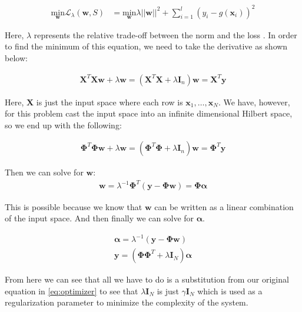 \documentclass[11pt, twoside]{article}   	%
\begin{document}
\begin{align*}
\underset{\mathbf{w}}{\text{min}} \mathbf{\mathcal{L}}_\lambda (\mathbf{w}, S) &= 
\underset{\mathbf{w}}{\text{min}} \lambda ||\mathbf{w}||^2 + \sum_{i=1}^{l}(y_i - g(\mathbf{x}_i))^2
\end{align*}

Here, $\lambda$ represents the relative trade-off between the norm and the loss \cite{kernelmethods}. In order to find the minimum of this equation, 
we need to take the derivative as shown below: 

\begin{align*}
\mathbf{X}^T\mathbf{X}\mathbf{w} + \lambda\mathbf{w} = (\mathbf{X}^T\mathbf{X} + \lambda \mathbf{I}_n)\mathbf{w} = \mathbf{X}^T\mathbf{y}
\end{align*}

Here, $\mathbf{X}$ is just the input space where each row is $\mathbf{x}_1, \ldots, \mathbf{x}_N$. We have, however, for this problem
cast the input space into an infinite dimensional Hilbert space, so we end up with the following: 

\begin{align*}
\mathbf{\Phi}^T\mathbf{\Phi}\mathbf{w} + \lambda\mathbf{w} = (\mathbf{\Phi}^T\mathbf{\Phi} + \lambda \mathbf{I}_n)\mathbf{w} = \mathbf{\Phi}^T\mathbf{y}
\end{align*}

Then we can solve for $\mathbf{w}$: 
\begin{align*}
\mathbf{w} = \lambda^{-1} \mathbf{\Phi}^T (\mathbf{y} - \mathbf{\Phi} \mathbf{w}) = \mathbf{\Phi}\mathbf{\alpha}
\end{align*}

This is possible because we know that $\mathbf{w}$ can be written as a linear combination of the input space. And then finally we can solve
for $\mathbf{\alpha}$.

\begin{align*}
\bm{\alpha} = \lambda^{-1}(\mathbf{y} - \mathbf{\Phi} \mathbf{w}) \\
\mathbf{y} = (\mathbf{\Phi \Phi}^T + \lambda\mathbf{I}_N)\mathbf{\alpha}
\end{align*}

From here we can see that all we have to do is a substitution from our original equation in \ref{eq:optimizer} to see that
$\lambda\bm{I}_N$ is just $\gamma\bm{I}_N$ which is used as a regularization parameter to minimize the complexity 
of the system. 
\end{document}
